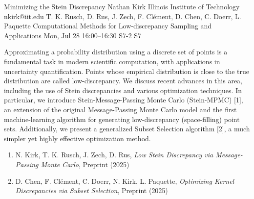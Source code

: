 \begin{talk}
  {Minimizing the Stein Discrepancy}%
  {Nathan Kirk}%
  {Illinois Institute of Technology}%
  {nkirk@iit.edu}%
  {T. K. Rusch, D. Rus, J. Zech, F. Cl\'ement, D. Chen, C. Doerr, L. Paquette}%
  {Computational Methods for Low-discrepancy Sampling and Applications}%
  {Mon, Jul 28 16:00--16:30}%
  {S7-2}%
  {S7}%
    
   
Approximating a probability distribution using a discrete set of points is a fundamental task in modern scientific computation, with applications in uncertainty quantification. Points whose empirical distribution is close to the true distribution are called low-discrepancy. We discuss recent advances in this area, including the use of Stein discrepancies and various optimization techniques. In particular, we introduce Stein-Message-Passing Monte Carlo (Stein-MPMC) [1], an extension of the original Message-Passing Monte Carlo model and the first machine-learning algorithm for generating low-discrepancy (space-filling) point sets. Additionally, we present a generalized Subset Selection algorithm [2], a much simpler yet highly effective optimization method.

\medskip

\begin{enumerate}
 \item[{[1]}] N. Kirk, T. K. Rusch, J. Zech, D. Rus, \textit{Low Stein Discrepancy via Message-Passing Monte Carlo}, Preprint (2025)
 \item[{[2]}] D. Chen, F. Cl\'ement, C. Doerr, N. Kirk, L. Paquette, \textit{Optimizing Kernel Discrepancies via Subset Selection}, Preprint (2025)
\end{enumerate}


\end{talk}

